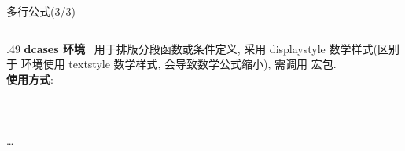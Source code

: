 \begin{frame}{多行公式(3/3)}
	\begin{columns}[onlytextwidth]
		\begin{column}{.49\columnwidth}
			\alert{\bfseries dcases 环境}~
			用于排版分段函数或条件定义, 采用 displaystyle 数学样式(区别于  环境使用 textstyle 数学样式, 会导致数学公式缩小), 需调用  宏包.\\[1ex]
			\textbf{使用方式}:\\[.5ex]
			\\
			\hspace*{1em}\\
			\hspace*{2em} \cmd{\textbackslash}\\
			\hspace*{2em}\ldots\\
			\hspace*{1em}\\
			\\[2ex]


\end{column}
\end{columns}
\end{frame}
